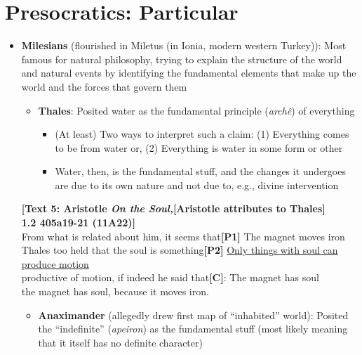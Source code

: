 \documentclass[11pt]{article}
\begin{document}
\section*{Presocratics: Particular}

\begin{itemize}\item{\textbf{Milesians} (flourished in Miletus (in Ionia, modern western Turkey)): Most famous for natural philosophy, trying to explain the structure of the world and natural events by identifying the fundamental elements that make up the world and the forces that govern them}

\begin{itemize}

\item{\textbf{Thales}: Posited water as the fundamental principle (\emph{arch\^{e}}) of everything}\begin{itemize}\item{(At least) Two ways to interpret such a claim: (1) Everything comes to be from water or, (2) Everything is water in some form or other}\item{Water, then, is the fundamental stuff, and the changes it undergoes are due to its own nature and not due to, e.g., divine intervention}\end{itemize}\end{itemize}

\noindent\textbf{[Text 5: Aristotle \emph{On the Soul,}}\hspace*{35mm}\textbf{[Aristotle attributes to Thales]}\\\textbf{1.2 405a19-21 (11A22)]}\\From what is related about him, it seems that\hspace*{8.5mm}\textbf{[P1]} The magnet moves iron\\Thales too held that the soul is something\hspace*{14mm}\textbf{[P2]} \underline{Only things with soul can produce motion} \\productive of motion, if indeed he said that\hspace*{11.5mm}\textbf{[C]}: The magnet has soul\\the magnet has soul, because it moves iron.

\begin{itemize}

\item{\textbf{Anaximander} (allegedly drew first map of ``inhabited'' world): Posited the ``indefinite'' (\emph{apeiron}) as the fundamental stuff (most likely meaning that it itself has no definite character)}


\end{itemize}
\end{itemize}
\end{document}
